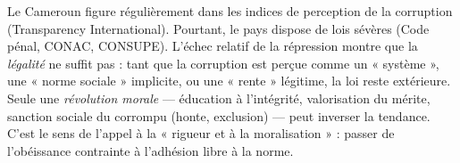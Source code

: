\documentclass[11pt]{article}
\begin{document}
\begin{savaistu}
Le Cameroun figure régulièrement dans les indices de perception de la corruption (Transparency International). Pourtant, le pays dispose de lois sévères (Code pénal, CONAC, CONSUPE). L'échec relatif de la répression montre que la \emph{légalité} ne suffit pas : tant que la corruption est perçue comme un « système », une « norme sociale » implicite, ou une « rente » légitime, la loi reste extérieure. Seule une \emph{révolution morale} — éducation à l'intégrité, valorisation du mérite, sanction sociale du corrompu (honte, exclusion) — peut inverser la tendance. C'est le sens de l'appel à la « rigueur et à la moralisation » : passer de l'obéissance contrainte à l'adhésion libre à la norme.
\end{savaistu}
\end{document}
